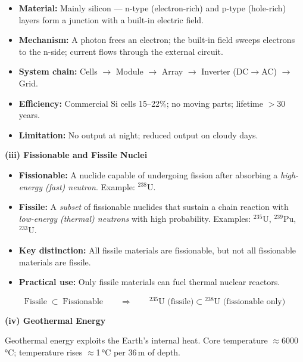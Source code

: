 \documentclass[12pt,a3paper]{article}
\begin{document}
\begin{enumerate}
\begin{tcolorbox}[enhanced,breakable,ansbox,colback=cA!4,colframe=cA,
  boxrule=0.8pt,arc=5pt,
  title={\textbf{Answer}},fonttitle=\bfseries\color{white},colbacktitle=cA]
\begin{itemize}[leftmargin=1.5em,itemsep=2pt]
  \item \textbf{Material:} Mainly silicon — n-type (electron-rich) and p-type (hole-rich) layers form a junction with a built-in electric field.
  \item \textbf{Mechanism:} A photon frees an electron; the built-in field sweeps electrons to the n-side; current flows through the external circuit.
  \item \textbf{System chain:} Cells $\to$ Module $\to$ Array $\to$ Inverter (DC$\to$AC) $\to$ Grid.
  \item \textbf{Efficiency:} Commercial Si cells 15--22\%; no moving parts; lifetime $>$30 years.
  \item \textbf{Limitation:} No output at night; reduced output on cloudy days.
\end{itemize}

\medskip
\textbf{(iii) Fissionable and Fissile Nuclei}

\begin{itemize}[leftmargin=1.5em,itemsep=2pt]
  \item \textbf{Fissionable:} A nuclide capable of undergoing fission after absorbing a \emph{high-energy (fast) neutron}. Example: ${}^{238}$U.
  \item \textbf{Fissile:} A \emph{subset} of fissionable nuclides that sustain a chain reaction with \emph{low-energy (thermal) neutrons} with high probability. Examples: ${}^{235}$U, ${}^{239}$Pu, ${}^{233}$U.
  \item \textbf{Key distinction:} All fissile materials are fissionable, but not all fissionable materials are fissile.
  \item \textbf{Practical use:} Only fissile materials can fuel thermal nuclear reactors.
\end{itemize}

\[
  \text{Fissile} \;\subset\; \text{Fissionable}
  \qquad \Longrightarrow \qquad
  {}^{235}\text{U (fissile)} \subset {}^{238}\text{U (fissionable only)}
\]

\medskip
\textbf{(iv) Geothermal Energy}

Geothermal energy exploits the Earth's internal heat. Core temperature $\approx$6000\,°C; temperature rises $\approx$1\,°C per 36\,m of depth.


\end{tcolorbox}
\end{enumerate}
\end{document}
